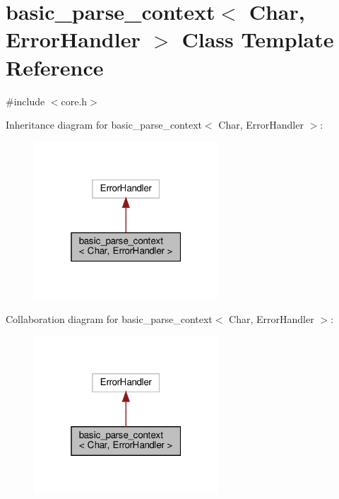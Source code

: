 \hypertarget{classbasic__parse__context}{}\section{basic\+\_\+parse\+\_\+context$<$ Char, Error\+Handler $>$ Class Template Reference}
\label{classbasic__parse__context}


{\ttfamily \#include $<$core.\+h$>$}



Inheritance diagram for basic\+\_\+parse\+\_\+context$<$ Char, Error\+Handler $>$\+:
\nopagebreak
\begin{figure}[H]
\begin{center}
\leavevmode
\includegraphics[width=196pt]{classbasic__parse__context__inherit__graph}
\end{center}
\end{figure}


Collaboration diagram for basic\+\_\+parse\+\_\+context$<$ Char, Error\+Handler $>$\+:
\nopagebreak
\begin{figure}[H]
\begin{center}
\leavevmode
\includegraphics[width=196pt]{classbasic__parse__context__coll__graph}
\end{center}
\end{figure}
